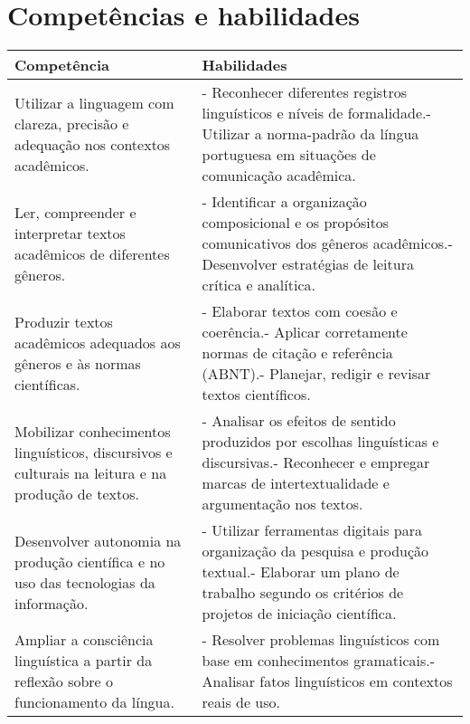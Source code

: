 \documentclass[
  letterpaper,
  DIV=11,
  numbers=noendperiod]{scrreprt}
\begin{document}
\section{Competências e
habilidades}\label{competuxeancias-e-habilidades}

\begin{longtable}[]{@{}
  >{\raggedright\arraybackslash}p{}
  >{\raggedright\arraybackslash}p{}@{}}
\toprule\noalign{}
\begin{minipage}[b]{\linewidth}\raggedright
Competência
\end{minipage} & \begin{minipage}[b]{\linewidth}\raggedright
Habilidades
\end{minipage} \\
\midrule\noalign{}
\endhead
\bottomrule\noalign{}
\endlastfoot
Utilizar a linguagem com clareza, precisão e adequação nos contextos
acadêmicos. & - Reconhecer diferentes registros linguísticos e níveis de
formalidade.- Utilizar a norma-padrão da língua portuguesa em situações
de comunicação acadêmica. \\
Ler, compreender e interpretar textos acadêmicos de diferentes gêneros.
& - Identificar a organização composicional e os propósitos
comunicativos dos gêneros acadêmicos.- Desenvolver estratégias de
leitura crítica e analítica. \\
Produzir textos acadêmicos adequados aos gêneros e às normas
científicas. & - Elaborar textos com coesão e coerência.- Aplicar
corretamente normas de citação e referência (ABNT).- Planejar, redigir e
revisar textos científicos. \\
Mobilizar conhecimentos linguísticos, discursivos e culturais na leitura
e na produção de textos. & - Analisar os efeitos de sentido produzidos
por escolhas linguísticas e discursivas.- Reconhecer e empregar marcas
de intertextualidade e argumentação nos textos. \\
Desenvolver autonomia na produção científica e no uso das tecnologias da
informação. & - Utilizar ferramentas digitais para organização da
pesquisa e produção textual.- Elaborar um plano de trabalho segundo os
critérios de projetos de iniciação científica. \\
Ampliar a consciência linguística a partir da reflexão sobre o
funcionamento da língua. & - Resolver problemas linguísticos com base em
conhecimentos gramaticais.- Analisar fatos linguísticos em contextos
reais de uso. \\
\end{longtable}
\end{document}

